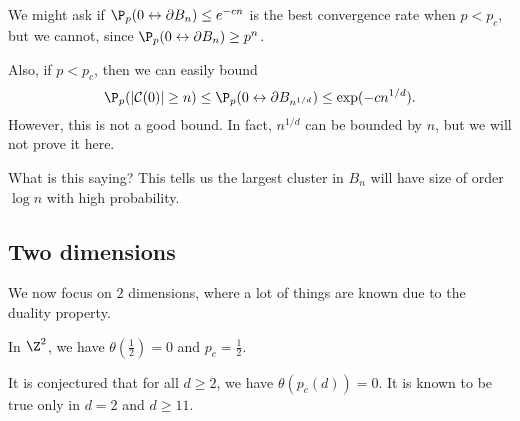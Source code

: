 \documentclass[a4paper]{article}
\begin{document}
We might ask if $\P_p(0 \leftrightarrow \partial B_n) \leq e^{-cn}$ is the best convergence rate when $p < p_c$, but we cannot, since $\P_p(0 \leftrightarrow \partial B_n) \geq p^n$.

Also, if $p < p_c$, then we can easily bound
\[
  \P_p(|\mathcal{C}(0)| \geq n) \leq \P_p(0 \leftrightarrow \partial B_{n^{1/d}}) \leq \exp(-c n^{1/d}).
\]
However, this is not a good bound. In fact, $n^{1/d}$ can be bounded by $n$, but we will not prove it here.

What is this saying? This tells us the largest cluster in $B_n$ will have size of order $\log n$ with high probability.

\subsection{Two dimensions}
We now focus on $2$ dimensions, where a lot of things are known due to the duality property.

\begin{thm}
  In $\Z^2$, we have $\theta \left(\frac{1}{2}\right) = 0$ and $p_c = \frac{1}{2}$.
\end{thm}
It is conjectured that for all $d \geq 2$, we have $\theta(p_c(d)) = 0$. It is known to be true only in $d = 2$ and $d \geq 11$.
\end{document}
